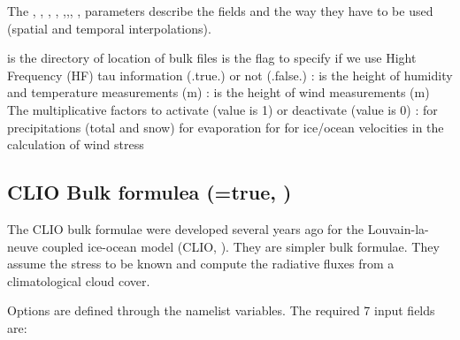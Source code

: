 \documentclass[NEMO_book]{subfiles}
\begin{document}
The  , , , , ,,, ,  parameters describe the fields and the way they have to be used (spatial and temporal interpolations). 

 is the directory of location of bulk files
 is the flag to specify if we use Hight Frequency (HF) tau information (.true.) or not (.false.)
: is the height of humidity and temperature measurements (m)
: is the height of wind measurements (m)
The multiplicative factors to activate (value is 1) or deactivate (value is 0) : 
 for precipitations (total and snow)
 for evaporation 
 for for ice/ocean velocities in the calculation of wind stress  

\subsection    [CLIO Bulk formulea (\np{ln\_clio}=true)]
		      {CLIO Bulk formulea (=true, )}
\label{SBC_blk_clio}

The CLIO bulk formulae were developed several years ago for the 
Louvain-la-neuve coupled ice-ocean model (CLIO, \cite{Goosse_al_JGR99}). 
They are simpler bulk formulae. They assume the stress to be known and 
compute the radiative fluxes from a climatological cloud cover. 

Options are defined through the   namelist variables.
The required 7 input fields are:
\end{document}
